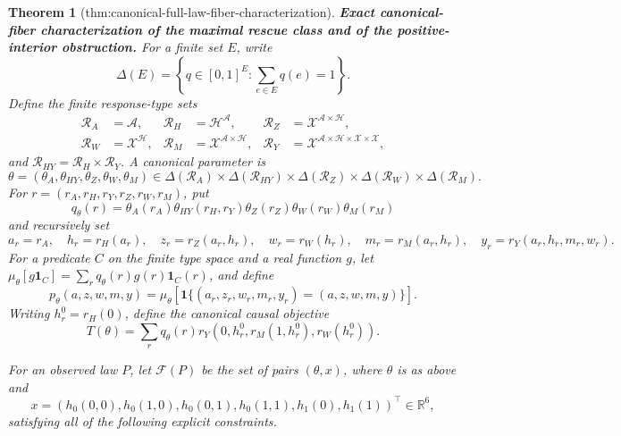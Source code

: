 \documentclass{article}
\newtheorem{theorem}{Theorem}
\begin{document}
\begin{theorem}[thm:canonical-full-law-fiber-characterization]\label{thm:canonical-full-law-fiber-characterization}
\textbf{Exact canonical-fiber characterization of the maximal rescue class and of the positive-interior obstruction.}
For a finite set \(E\), write
\[
 \Delta(E)=\left\{q\in[0,1]^E:\sum_{e\in E}q(e)=1\right\}.
\]
Define the finite response-type sets
\[
\begin{aligned}
 \mathcal R_A&=\mathcal A,&
 \mathcal R_H&=\mathcal H^{\mathcal A},&
 \mathcal R_Z&=\mathcal X^{\mathcal A\times\mathcal H},\\
 \mathcal R_W&=\mathcal X^{\mathcal H},&
 \mathcal R_M&=\mathcal X^{\mathcal A\times\mathcal H},&
 \mathcal R_Y&=\mathcal X^{\mathcal A\times\mathcal H\times\mathcal X\times\mathcal X},
\end{aligned}
\]
and \(\mathcal R_{HY}=\mathcal R_H\times\mathcal R_Y\).  A canonical parameter is
\[
 \theta=(\theta_A,\theta_{HY},\theta_Z,\theta_W,\theta_M)
 \in\Delta(\mathcal R_A)\times\Delta(\mathcal R_{HY})
 \times\Delta(\mathcal R_Z)\times\Delta(\mathcal R_W)
 \times\Delta(\mathcal R_M).
\]
For \(r=(r_A,r_H,r_Y,r_Z,r_W,r_M)\), put
\[
 q_\theta(r)=\theta_A(r_A)\theta_{HY}(r_H,r_Y)
 \theta_Z(r_Z)\theta_W(r_W)\theta_M(r_M)
\]
and recursively set
\[
 a_r=r_A,\quad h_r=r_H(a_r),\quad z_r=r_Z(a_r,h_r),\quad
 w_r=r_W(h_r),\quad m_r=r_M(a_r,h_r),\quad
 y_r=r_Y(a_r,h_r,m_r,w_r).
\]
For a predicate \(C\) on the finite type space and a real function \(g\), let
\(\mu_\theta[g\mathbf 1_C]=\sum_rq_\theta(r)g(r)\mathbf 1_C(r)\), and define
\[
 p_\theta(a,z,w,m,y)=
 \mu_\theta[\mathbf 1\{(a_r,z_r,w_r,m_r,y_r)=(a,z,w,m,y)\}].
\]
Writing \(h_r^0=r_H(0)\), define the canonical causal objective
\[
 T(\theta)=\sum_rq_\theta(r)
 r_Y\!\left(0,h_r^0,r_M(1,h_r^0),r_W(h_r^0)\right).
 \tag{12}
\]

For an observed law \(P\), let \(\mathcal F(P)\) be the set of pairs
\((\theta,x)\), where \(\theta\) is as above and
\[
 x=(h_0(0,0),h_0(1,0),h_0(0,1),h_0(1,1),h_1(0),h_1(1))^\top\in\mathbb R^6,
\]
satisfying all of the following explicit constraints.


\end{theorem}
\end{document}
